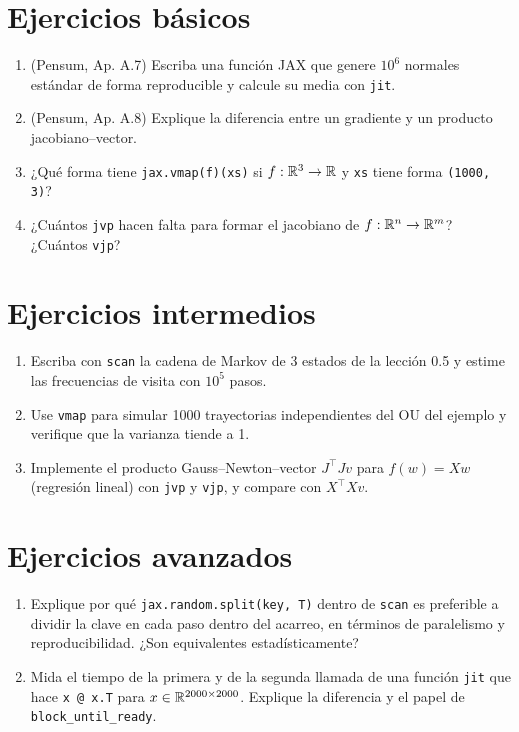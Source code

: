 \documentclass[11pt,a4paper]{article}
\begin{document}

\section{Ejercicios básicos}
\begin{enumerate}[label=\textbf{B\arabic*.}]
\item (Pensum, Ap. A.7) Escriba una función JAX que genere $10^6$ normales estándar de forma reproducible y calcule su media con \texttt{jit}.
\item (Pensum, Ap. A.8) Explique la diferencia entre un gradiente y un producto jacobiano--vector.
\item ¿Qué forma tiene \texttt{jax.vmap(f)(xs)} si $f:\mathbb{R}^3\to\mathbb{R}$ y \texttt{xs} tiene forma \texttt{(1000, 3)}?
\item ¿Cuántos \texttt{jvp} hacen falta para formar el jacobiano de $f:\mathbb{R}^n\to\mathbb{R}^m$? ¿Cuántos \texttt{vjp}?
\end{enumerate}

\section{Ejercicios intermedios}
\begin{enumerate}[label=\textbf{I\arabic*.}]
\item Escriba con \texttt{scan} la cadena de Markov de 3 estados de la lección 0.5 y estime las frecuencias de visita con $10^5$ pasos.
\item Use \texttt{vmap} para simular 1000 trayectorias independientes del OU del ejemplo y verifique que la varianza tiende a 1.
\item Implemente el producto Gauss--Newton--vector $J^\top Jv$ para $f(w)=Xw$ (regresión lineal) con \texttt{jvp} y \texttt{vjp}, y compare con $X^\top Xv$.
\end{enumerate}

\section{Ejercicios avanzados}
\begin{enumerate}[label=\textbf{A\arabic*.}]
\item Explique por qué \texttt{jax.random.split(key, T)} dentro de \texttt{scan} es preferible a dividir la clave en cada paso dentro del acarreo, en términos de paralelismo y reproducibilidad. ¿Son equivalentes estadísticamente?
\item Mida el tiempo de la primera y de la segunda llamada de una función \texttt{jit} que hace \texttt{x @ x.T} para $x\in\mathbb{R}^{2000\times2000}$. Explique la diferencia y el papel de \texttt{block\_until\_ready}.
\end{enumerate}
\end{document}
